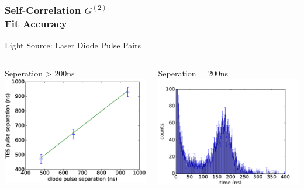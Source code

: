 \begin{frame}\frametitle{Self-Correlation $G^{(2)}$\\Fit Accuracy}
  \begin{center}
  Light Source: Laser Diode Pulse Pairs
  \begin{columns}
  \begin{center}
  Seperation > 200ns
    \includegraphics[width=\textwidth]{images/fit_accuracy/fitted_vs_actual_pulse_separation.eps}
  \end{center}
  \begin{center}
  Seperation = 200ns
  \includegraphics[width=\textwidth]{images/fit_accuracy/200ns/200ns_g2.pdf}
  \end{center}
  \end{columns}
  \end{center}
\end{frame}

